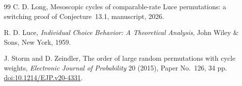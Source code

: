 \documentclass[11pt]{article}
\theoremstyle{remark}
\begin{document}
\begin{thebibliography}{99}
C. D. Long,
\newblock Mesoscopic cycles of comparable-rate Luce permutations: a
switching proof of Conjecture~13.1,
\newblock manuscript, 2026.

R. D. Luce,
\newblock \emph{Individual Choice Behavior: A Theoretical Analysis},
\newblock John Wiley \& Sons, New York, 1959.

J. Storm and D. Zeindler,
\newblock The order of large random permutations with cycle weights,
\newblock \emph{Electronic Journal of Probability} 20 (2015), Paper No.~126,
34 pp.
\newblock \href{https://doi.org/10.1214/EJP.v20-4331}
{doi:10.1214/EJP.v20-4331}.

\end{thebibliography}
\end{document}
